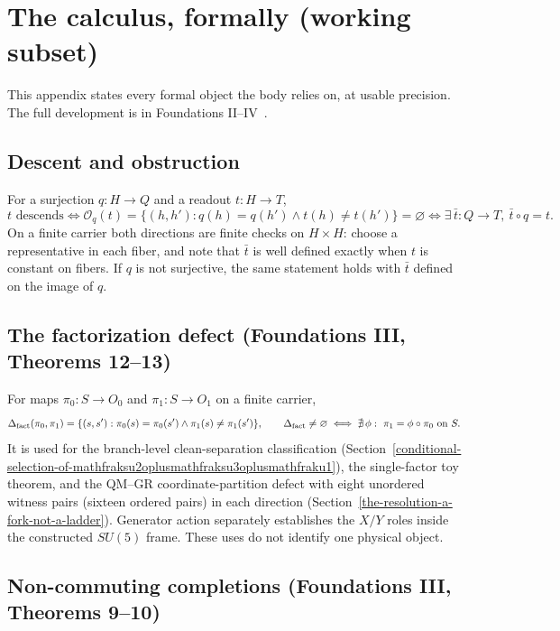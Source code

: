 \section{The calculus, formally (working subset)}\label{the-calculus-formally-working-subset}

This appendix states every formal object the body relies on, at usable precision. The full development is in
Foundations II--IV~\citep{Tsiokos_FoundationsII,Tsiokos_FoundationsIII,Tsiokos_FoundationsIV}.

\subsection{Descent and obstruction}\label{descent-and-obstruction}

For a surjection \(q:H\to Q\) and a readout \(t:H\to T\),
\[
t \text{ descends} \iff \mathcal O_q(t) = \{(h,h'): q(h)=q(h') \wedge t(h)\neq t(h')\} = \varnothing
\iff \exists\,\bar t:Q\to T,\ \bar t\circ q = t .
\]
On a finite carrier both directions are finite checks on \(H\times H\): choose a representative in each fiber, and
note that \(\bar t\) is well defined exactly when \(t\) is constant on fibers. If \(q\) is not surjective, the same
statement holds with \(\bar t\) defined on the image of \(q\).

\subsection{The factorization defect (Foundations III, Theorems 12--13)}\label{strict-extension-and-the-factorization-defect-fiii-thms-1213}

For maps \(\pi_0:S\to O_0\) and \(\pi_1:S\to O_1\) on a finite carrier,
\[
\Deltafact(\pi_0,\pi_1) = \{(s,s'): \pi_0(s)=\pi_0(s') \wedge \pi_1(s)\neq\pi_1(s')\},
\qquad
\Deltafact\neq\varnothing \iff \nexists\,\phi:\ \pi_1 = \phi\circ\pi_0 \ \text{on } S .
\]
It is used for the branch-level clean-separation classification
(Section~\ref{conditional-selection-of-mathfraksu2oplusmathfraksu3oplusmathfraku1}), the single-factor toy theorem,
and the QM--GR coordinate-partition defect with eight unordered witness pairs (sixteen ordered pairs) in each direction
(Section~\ref{the-resolution-a-fork-not-a-ladder}). Generator action separately establishes the \(X/Y\) roles inside
the constructed \(SU(5)\) frame. These uses do not identify one physical object.

\subsection{Non-commuting completions (Foundations III, Theorems 9--10)}\label{non-commuting-completions-fiii-thms-910}

